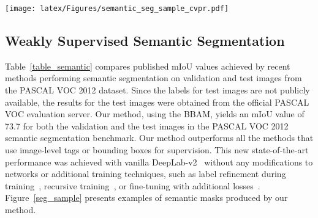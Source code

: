 \documentclass[final]{cvpr}
\begin{document}
\begin{figure*}[t]
  \centering
  \texttt{[image: latex/Figures/semantic\_seg\_sample\_cvpr.pdf]} \\[-0.7em]
  \caption{\label{seg_sample} Examples of predicted semantic masks for PASCAL VOC \textit{val} images of DSRG~\cite{huang2018weakly}, Shen \textit{et al.}~\cite{shen2018bootstrapping}, FickleNet~\cite{lee2019ficklenet}, Lee \textit{et al.}~\cite{lee2019frame}, and our method.}
  \vspace{-1.4em}
\end{figure*}

 



\subsection{Weakly Supervised Semantic Segmentation}
Table~\ref{table_semantic} compares published mIoU values achieved by recent methods performing semantic segmentation on validation and test images from the PASCAL VOC 2012 dataset. Since the labels for test images are not publicly available, the results for the test images were obtained from the official PASCAL VOC evaluation server.
Our method, using the BBAM, yields an mIoU value of 73.7 for both the validation and the test images in the PASCAL VOC 2012 semantic segmentation benchmark. Our method outperforms all the methods that use image-level tags or bounding boxes for supervision. 
This new state-of-the-art performance was achieved with vanilla DeepLab-v2~\cite{chen2017deeplab} without any modifications to networks or additional training techniques, such as label refinement during training~\cite{dai2015boxsup}, recursive training~\cite{khoreva2017simple}, or fine-tuning with additional losses~\cite{song2019box}. Figure~\ref{seg_sample} presents examples of semantic masks produced by our method.
\end{document}
